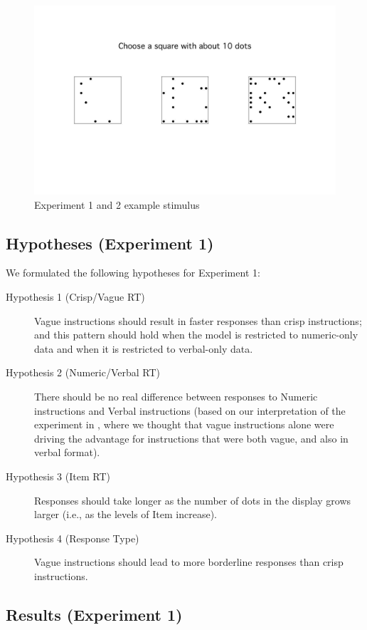 \begin{figure}[htbp]
\centering
\includegraphics[width=.75\textwidth]{figures/Ce1-example-screenshot}
\caption{Experiment 1 and 2 example stimulus}
\label{Experiment1and2examplestimulus}
\end{figure}

\subsection{Hypotheses (Experiment 1)} 

We formulated the following hypotheses for Experiment 1:

\begin{description}
	\item [Hypothesis 1 (Crisp/Vague RT)] Vague instructions should result in faster responses than crisp instructions; and this pattern should hold when the model is restricted to numeric-only data and when it is restricted to verbal-only data.
	\item [Hypothesis 2 (Numeric/Verbal RT)] There should be no real difference between responses to Numeric instructions and Verbal instructions (based on our interpretation of the experiment in \citet{green2013utility}, where we thought that vague instructions alone were driving the advantage for instructions that were both vague, and also in verbal format).
	\item [Hypothesis 3 (Item RT)] Responses should take longer as the number of dots in the display grows larger (i.e., as the levels of Item increase).
	\item [Hypothesis 4 (Response Type)] Vague instructions should lead to more borderline responses than crisp instructions.
\end{description}

\subsection{Results (Experiment 1)} 
